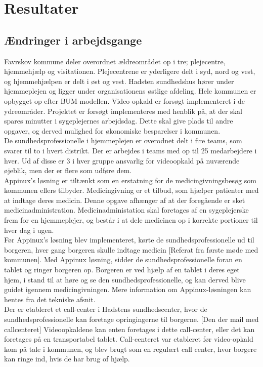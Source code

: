 \section{Resultater}
\subsection{Ændringer i arbejdsgange}
Favrskov kommune deler overordnet ældreområdet op i tre; plejecentre, hjemmehjælp og visitationen. Plejecentrene er yderligere delt i syd, nord og vest, og hjemmehjælpen er delt i øst og vest. Hadsten sundhedshus hører under hjemmeplejen og ligger under organisationens østlige afdeling. Hele kommunen er opbygget op efter BUM-modellen. Video opkald er forsøgt implementeret i de ydreområder. Projektet er forsøgt implementeres med henblik på, at der skal spares minutter i sygeplejernes arbejdsdag. Dette skal give plads til andre opgaver, og derved mulighed for økonomiske besparelser i kommunen. \\
De sundhedsprofessionelle i hjemmeplejen er overodnet delt i fire teams, som svarer til to i hvert distrikt. Der er arbejdes i teams med op til 25 medarbejdere i hver. Ud af disse er 3 i hver gruppe ansvarlig for videoopkald på nuværende øjeblik, men der er flere som udføre dem.  \\
Appinux’s løsning er tiltænkt som en erstatning for de medicingivningsbesøg som kommunen ellers tilbyder. Medicingivning er et tilbud, som hjælper patienter med at indtage deres medicin. Denne opgave afhænger af at der foregående er sket medicinadministration. Medicinadministation skal foretages af en sygeplejerske frem for en hjemmeplejer, og består i at dele medicinen op i korrekte portioner til hver dag i ugen. \\
Før Appinux’s løsning blev implementeret, kørte de sundhedsprofessionelle ud til borgeren, hver gang borgeren skulle indtage medicin [Referat fra første møde med kommunen]. Med Appinux løsning, sidder de sundhedsprofessionelle foran en tablet og ringer borgeren op. Borgeren er ved hjælp af en tablet i deres eget hjem, i stand til at høre og se den sundhedsprofessionelle, og kan derved blive guidet igennem medicingivningen. Mere information om Appinux-løsningen kan hentes fra det tekniske afsnit. \\
Der er etableret et call-center i Hadstens sundhedscenter, hvor de sundhedsprofessionelle kan foretage opringingerne til borgerne. [Den der mail med callcenteret] Videoopkaldene kan enten foretages i dette call-center, eller det kan foretages på en transportabel tablet. Call-centeret var etableret før video-opkald kom på tale i kommunen, og blev brugt som en regulært call center, hvor borgere kan ringe ind, hvis de har brug of hjælp. \\
